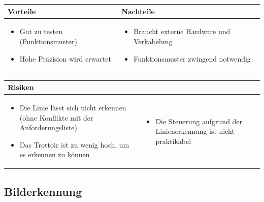 \begin{table}[h]
\begin{tabular}{p{} | p{}}


 \textbf{Vorteile} & \textbf{Nachteile} \\ \hline
	 
\begin{itemize}
\item Gut zu testen (Funktionsmuster)
\item Hohe Präzision wird erwartet
\end{itemize}

 
 &
 
\begin{itemize}
\item Braucht externe Hardware und Verkabelung
\item Funktionsmuster zwingend notwendig
\end{itemize}

\end{tabular}
\end{table}

\begin{table}[h]
\begin{tabular}{p{}p{}}

 \textbf{Risiken} & \\ \hline
	 
\begin{itemize}
\item Die Linie lässt sich nicht erkennen (ohne Konflikte mit der Anforderungsliste)
\item Das Trottoir ist zu wenig hoch, um es erkennen zu können
\end{itemize}
&
\begin{itemize}
\item Die Steuerung aufgrund der Linienerkennung ist nicht praktikabel
\end{itemize}

 
\end{tabular}
\end{table}

\pagebreak


\subsection{Bilderkennung}

